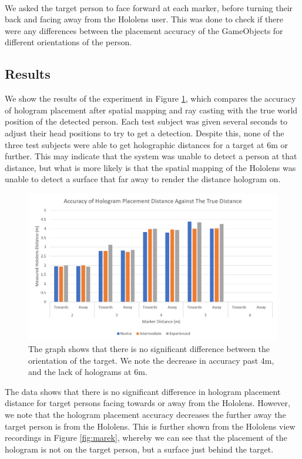 \paragraph{} We asked the target person to face forward at each marker, before turning their back and facing away from the Hololens user. This was done to check if there were any differences between the placement accuracy of the GameObjects for different orientations of the person.

\subsection{Results}
We show the results of the experiment in Figure \ref{fig:hddResults}, which compares the accuracy of hologram placement after spatial mapping and ray casting with the true world position of the detected person. Each test subject was given several seconds to adjust their head positions to try to get a detection. Despite this, none of the three test subjects were able to get holographic distances for a target at $6$m or further. This may indicate that the system was unable to detect a person at that distance, but what is more likely is that the spatial mapping of the Hololens was unable to detect a surface that far away to render the distance hologram on.

\begin{figure}[ht]
    \centering
    \includegraphics[width=1.0\linewidth]{img/chapter6_test/hddtestresults.png}
    \caption{The graph shows that there is no significant difference between the orientation of the target. We note the decrease in accuracy past $4$m, and the lack of holograms at $6$m.}
    \label{fig:hddResults}
\end{figure}

The data shows that there is no significant difference in hologram placement distance for target persons facing towards or away from the Hololens. However, we note that the hologram placement accuracy decreases the further away the target person is from the Hololens. This is further shown from the Hololens view recordings in Figure \ref{fig:marek}, whereby we can see that the placement of the hologram is not on the target person, but a surface just behind the target.

